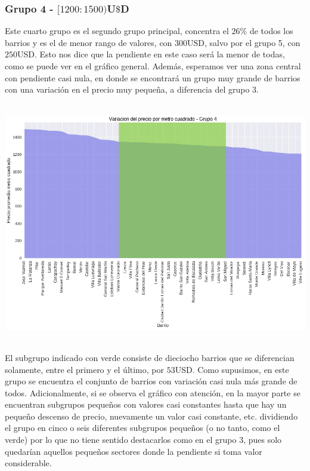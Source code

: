 \documentclass[a4paper, 10pt]{article}
\newcommand\tab[1][0.5cm]{\hspace*{#1}}
\begin{document}
				\subsubsection{Grupo 4 - $[1200:1500)$U$\$$D}
					Este cuarto grupo es el segundo grupo principal, concentra el $26\%$ de todos los barrios y es el de menor
					rango de valores, con $300$USD, salvo por el grupo 5, con $250$USD. Esto nos dice que la pendiente en este
					caso será la menor de todas, como se puede ver en el gráfico general. Además, esperamos ver una zona central
					con pendiente casi nula, en donde se encontrará un grupo muy grande de barrios con una variación en el precio
					muy pequeña, a diferencia del grupo 3.
					\begin{center}
   		    				\includegraphics[width=6in, height=4.13in]{images/m2Group4Area}
				  	\end{center}
				  	\tab El subgrupo indicado con verde consiste de dieciocho barrios que se diferencian solamente, entre el primero
				  	y el último, por $53$USD. Como supusimos, en este grupo se encuentra el conjunto de barrios con variación casi
				  	nula más grande de todos. Adicionalmente, si se observa el gráfico con atención, en la mayor parte se encuentran
				  	subgrupos pequeños con valores casi constantes hasta que hay un pequeño descenso de precio, nuevamente un valor
				  	casi constante, etc. dividiendo el grupo en cinco o seis diferentes subgrupos pequeños (o no tanto, como el
				  	verde) por lo que no tiene sentido destacarlos como en el grupo 3, pues solo quedarían aquellos pequeños sectores
				  	donde la pendiente si toma valor considerable. \\
\end{document}
